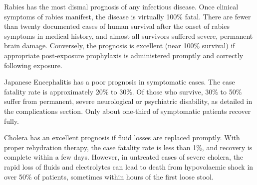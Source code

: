 Rabies has the most dismal prognosis of any infectious disease. Once clinical symptoms of rabies manifest, the disease is virtually 100\% fatal. There are fewer than twenty documented cases of human survival after the onset of rabies symptoms in medical history, and almost all survivors suffered severe, permanent brain damage. Conversely, the prognosis is excellent (near 100\% survival) if appropriate post-exposure prophylaxis is administered promptly and correctly following exposure.

Japanese Encephalitis has a poor prognosis in symptomatic cases. The case fatality rate is approximately 20\% to 30\%. Of those who survive, 30\% to 50\% suffer from permanent, severe neurological or psychiatric disability, as detailed in the complications section. Only about one-third of symptomatic patients recover fully.

Cholera has an excellent prognosis if fluid losses are replaced promptly. With proper rehydration therapy, the case fatality rate is less than 1\%, and recovery is complete within a few days. However, in untreated cases of severe cholera, the rapid loss of fluids and electrolytes can lead to death from hypovolaemic shock in over 50\% of patients, sometimes within hours of the first loose stool.

